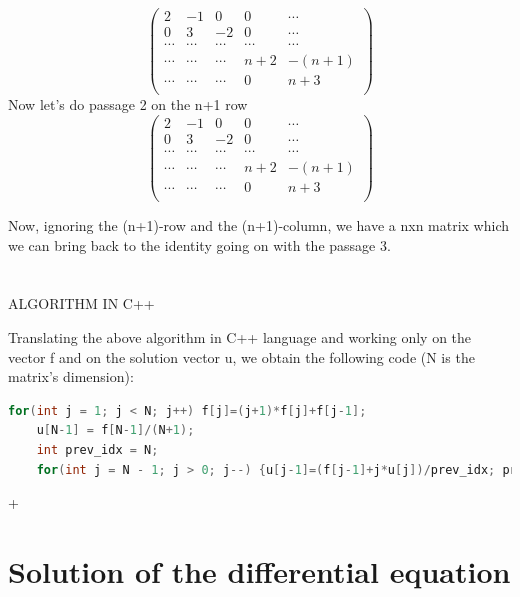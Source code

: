 \documentclass {article}
\begin{document}
\begin{equation}
\left(
\begin{array}{ccccc}
  2 & -1 & 0 & 0 & \cdots \\
  0 & 3 & -2 & 0 & \cdots \\
  \cdots & \cdots & \cdots & \cdots & \cdots \\
  \cdots & \cdots & \cdots & n+2 & -(n+1) \\
  \cdots & \cdots & \cdots & 0 & n+3 \\
\end{array}
\right)
\end{equation}
Now let's do passage 2 on the n+1 row
\begin{equation}
\left(
\begin{array}{ccccc}
  2 & -1 & 0 & 0 & \cdots \\
  0 & 3 & -2 & 0 & \cdots \\
  \cdots & \cdots & \cdots & \cdots & \cdots \\
  \cdots & \cdots & \cdots & n+2 & -(n+1) \\
  \cdots & \cdots & \cdots & 0 & n+3 \\
\end{array}
\right)
\end{equation}

Now, ignoring the (n+1)-row and the (n+1)-column, we have a nxn matrix which we can bring back to the identity going on with the passage 3.
\\
\\
\\
ALGORITHM IN C++

Translating the above algorithm in C++ language and working only on the vector f and on the solution vector u, we obtain the following code (N is the matrix's dimension):

\begin{lstlisting}[language=cpp]
    for(int j = 1; j < N; j++) f[j]=(j+1)*f[j]+f[j-1];
    u[N-1] = f[N-1]/(N+1);
    int prev_idx = N;
    for(int j = N - 1; j > 0; j--) {u[j-1]=(f[j-1]+j*u[j])/prev_idx; prev_idx = j;}
\end{lstlisting}+

\section{Solution of the differential equation}
\end{document}
